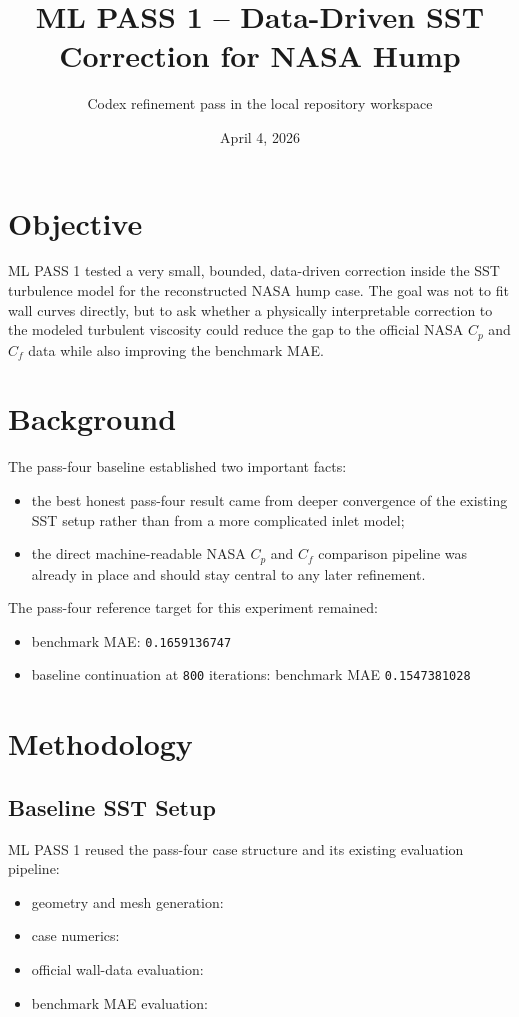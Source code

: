\documentclass[11pt]{article}
\title{ML PASS 1 -- Data-Driven SST Correction for NASA Hump}
\author{Codex refinement pass in the local repository workspace}
\date{April 4, 2026}
\begin{document}
\setlength{\emergencystretch}{3em}
\maketitle

\section{Objective}
ML PASS 1 tested a very small, bounded, data-driven correction inside the SST turbulence model for the reconstructed NASA hump case. The goal was not to fit wall curves directly, but to ask whether a physically interpretable correction to the modeled turbulent viscosity could reduce the gap to the official NASA \(C_p\) and \(C_f\) data while also improving the benchmark MAE.

\section{Background}
The pass-four baseline established two important facts:
\begin{itemize}
\item the best honest pass-four result came from deeper convergence of the existing SST setup rather than from a more complicated inlet model;
\item the direct machine-readable NASA \(C_p\) and \(C_f\) comparison pipeline was already in place and should stay central to any later refinement.
\end{itemize}

The pass-four reference target for this experiment remained:
\begin{itemize}
\item benchmark MAE: \texttt{0.1659136747}
\item baseline continuation at \texttt{800} iterations: benchmark MAE \texttt{0.1547381028}
\end{itemize}

\section{Methodology}
\subsection{Baseline SST Setup}
ML PASS 1 reused the pass-four case structure and its existing evaluation pipeline:
\begin{itemize}
\item geometry and mesh generation:
\item case numerics:
\item official wall-data evaluation:
\item benchmark MAE evaluation:
\end{itemize}
\end{document}
